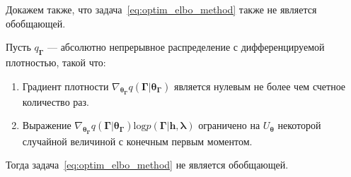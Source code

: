 Докажем также, что задача~\eqref{eq:optim_elbo_method} также не является обобщающей.
\begin{theorem}
Пусть $q_{\boldsymbol{\Gamma}}$ --- абсолютно непрерывное распределение с дифференцируемой плотностью, такой что:
\begin{enumerate}
\item Градиент плотности $\nabla_{\boldsymbol{\theta}_{\boldsymbol{\Gamma}}} q(\boldsymbol{\Gamma}|\boldsymbol{\theta}_{\boldsymbol{\Gamma}})$ является нулевым не более чем счетное количество раз. 
\item Выражение $\nabla_{\boldsymbol{\theta}_{\boldsymbol{\Gamma}}} q(\boldsymbol{\Gamma}|\boldsymbol{\theta}_{\boldsymbol{\Gamma}}) \text{log}p(\boldsymbol{\Gamma}|\mathbf{h}, \boldsymbol{\lambda})$ ограничено на $U_{\boldsymbol{\theta}}$ некоторой случайной величиной с конечным первым моментом.
\end{enumerate}
Тогда задача~\eqref{eq:optim_elbo_method} не является обобщающей.
\end{theorem}
